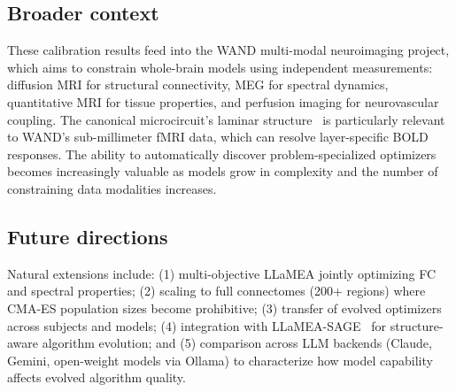 \documentclass[11pt,a4paper]{article}
\begin{document}
\subsection{Broader context}

These calibration results feed into the WAND multi-modal neuroimaging project, which aims to constrain whole-brain models using independent measurements: diffusion MRI for structural connectivity, MEG for spectral dynamics, quantitative MRI for tissue properties, and perfusion imaging for neurovascular coupling.
The canonical microcircuit's laminar structure~\citep{Bastos2012} is particularly relevant to WAND's sub-millimeter fMRI data, which can resolve layer-specific BOLD responses.
The ability to automatically discover problem-specialized optimizers becomes increasingly valuable as models grow in complexity and the number of constraining data modalities increases.

\subsection{Future directions}

Natural extensions include: (1) multi-objective LLaMEA jointly optimizing FC and spectral properties; (2) scaling to full connectomes (200+ regions) where CMA-ES population sizes become prohibitive; (3) transfer of evolved optimizers across subjects and models; (4) integration with LLaMEA-SAGE~\citep{llamea-sage} for structure-aware algorithm evolution; and (5) comparison across LLM backends (Claude, Gemini, open-weight models via Ollama) to characterize how model capability affects evolved algorithm quality.




\end{document}
